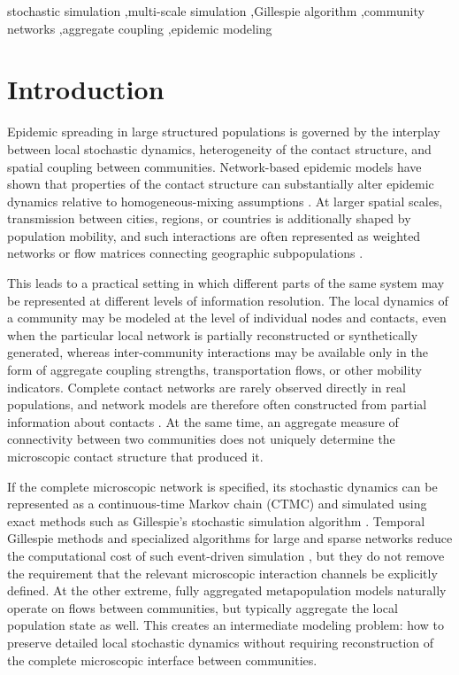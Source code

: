 \documentclass[a4paper,fleqn]{cas-sc}
\begin{document}
\begin{keywords}
stochastic simulation \sep multi-scale simulation \sep Gillespie algorithm \sep community networks \sep aggregate coupling \sep epidemic modeling
\end{keywords}

\maketitle


\section{Introduction}
\label{sec:introduction}

Epidemic spreading in large structured populations is governed by the interplay between local stochastic dynamics, heterogeneity of the contact structure, and spatial coupling between communities. Network-based epidemic models have shown that properties of the contact structure can substantially alter epidemic dynamics relative to homogeneous-mixing assumptions \cite{keeling2005,pastorsatorras2015}. At larger spatial scales, transmission between cities, regions, or countries is additionally shaped by population mobility, and such interactions are often represented as weighted networks or flow matrices connecting geographic subpopulations \cite{balcan2009}.

This leads to a practical setting in which different parts of the same system may be represented at different levels of information resolution. The local dynamics of a community may be modeled at the level of individual nodes and contacts, even when the particular local network is partially reconstructed or synthetically generated, whereas inter-community interactions may be available only in the form of aggregate coupling strengths, transportation flows, or other mobility indicators. Complete contact networks are rarely observed directly in real populations, and network models are therefore often constructed from partial information about contacts \cite{danon2011}. At the same time, an aggregate measure of connectivity between two communities does not uniquely determine the microscopic contact structure that produced it.

If the complete microscopic network is specified, its stochastic dynamics can be represented as a continuous-time Markov chain (CTMC) and simulated using exact methods such as Gillespie's stochastic simulation algorithm \cite{gillespie1977exact}. Temporal Gillespie methods and specialized algorithms for large and sparse networks reduce the computational cost of such event-driven simulation \cite{vestergaard2015,kuryliak2025simulating}, but they do not remove the requirement that the relevant microscopic interaction channels be explicitly defined. At the other extreme, fully aggregated metapopulation models naturally operate on flows between communities, but typically aggregate the local population state as well. This creates an intermediate modeling problem: how to preserve detailed local stochastic dynamics without requiring reconstruction of the complete microscopic interface between communities.
\end{document}
